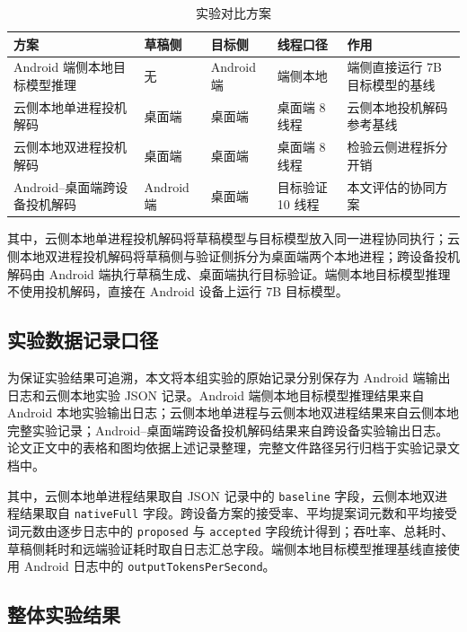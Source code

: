 \begin{table}[htbp]
  \centering
  \caption{实验对比方案}
  \label{tab:schemes}
  \small
  \begin{tabularx}{0.98\textwidth}{p{34mm}p{18mm}p{18mm}p{25mm}X}
    \toprule
    方案 & 草稿侧 & 目标侧 & 线程口径 & 作用 \\
    \midrule
    Android 端侧本地目标模型推理 & 无 & Android 端 & 端侧本地 & 端侧直接运行 7B 目标模型的基线 \\
    云侧本地单进程投机解码 & 桌面端 & 桌面端 & 桌面端 8 线程 & 云侧本地投机解码参考基线 \\
    云侧本地双进程投机解码 & 桌面端 & 桌面端 & 桌面端 8 线程 & 检验云侧进程拆分开销 \\
    Android--桌面端跨设备投机解码 & Android 端 & 桌面端 & 目标验证 10 线程 & 本文评估的协同方案 \\
    \bottomrule
  \end{tabularx}
\end{table}

其中，云侧本地单进程投机解码将草稿模型与目标模型放入同一进程协同执行；云侧本地双进程投机解码将草稿侧与验证侧拆分为桌面端两个本地进程；跨设备投机解码由 Android 端执行草稿生成、桌面端执行目标验证。端侧本地目标模型推理不使用投机解码，直接在 Android 设备上运行 7B 目标模型。

\subsection{实验数据记录口径}

为保证实验结果可追溯，本文将本组实验的原始记录分别保存为 Android 端输出日志和云侧本地实验 JSON 记录。Android 端侧本地目标模型推理结果来自 Android 本地实验输出日志；云侧本地单进程与云侧本地双进程结果来自云侧本地完整实验记录；Android--桌面端跨设备投机解码结果来自跨设备实验输出日志。论文正文中的表格和图均依据上述记录整理，完整文件路径另行归档于实验记录文档中。

其中，云侧本地单进程结果取自 JSON 记录中的 \texttt{baseline} 字段，云侧本地双进程结果取自 \texttt{nativeFull} 字段。跨设备方案的接受率、平均提案词元数和平均接受词元数由逐步日志中的 \texttt{proposed} 与 \texttt{accepted} 字段统计得到；吞吐率、总耗时、草稿侧耗时和远端验证耗时取自日志汇总字段。端侧本地目标模型推理基线直接使用 Android 日志中的 \texttt{outputTokensPerSecond}。

\subsection{整体实验结果}

